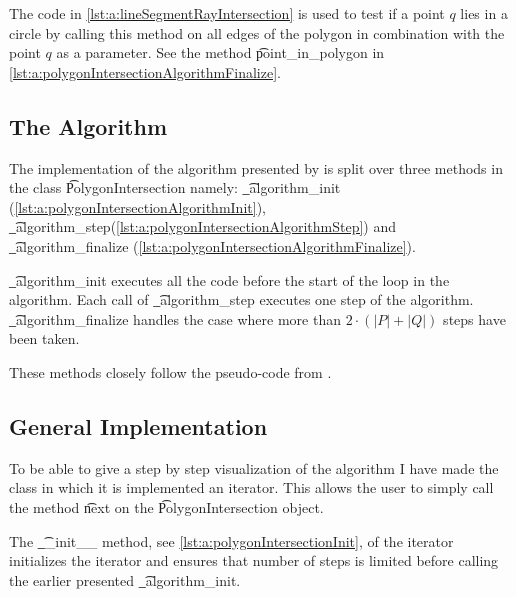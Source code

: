 	The code in \autoref{lst:a:lineSegmentRayIntersection} is used to test if a point $q$ lies in a circle by calling this method on all edges of the polygon in combination with the point $q$ as a parameter. See the method \t{point_in_polygon} in \autoref{lst:a:polygonIntersectionAlgorithmFinalize}.



\subsection*{The Algorithm}
	The implementation of the algorithm presented by \textcite{o1982new} is split over three methods in the class \t{PolygonIntersection} namely: \t{_algorithm_init} (\autoref{lst:a:polygonIntersectionAlgorithmInit}), \t{_algorithm_step}(\autoref{lst:a:polygonIntersectionAlgorithmStep}) and \t{_algorithm_finalize} (\autoref{lst:a:polygonIntersectionAlgorithmFinalize}).

	\t{_algorithm_init} executes all the code before the start of the loop in the algorithm. Each call of \t{_algorithm_step} executes one step of the algorithm. \t{_algorithm_finalize} handles the case where more than $2 \cdot (|P| + |Q|)$ steps have been taken. 

	These methods closely follow the pseudo-code from \citeauthor{o1982new}.

	

	

	

\subsection*{General Implementation}
	To be able to give a step by step visualization of the algorithm I have made the class in which it is implemented an iterator. This allows the user to simply call the method \t{next} on the \t{PolygonIntersection} object. 

	The \t{__init__} method, see \autoref{lst:a:polygonIntersectionInit}, of the iterator initializes the iterator and ensures that number of steps is limited before calling the earlier presented \t{_algorithm_init}. 

